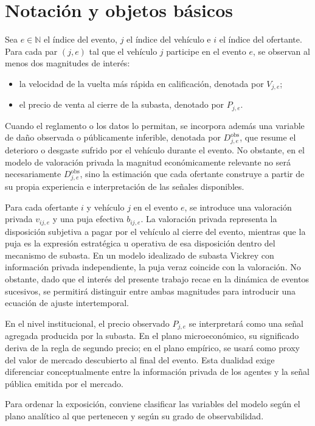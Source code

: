 \documentclass[11pt,a4paper]{article}
\theoremstyle{definition}
\begin{document}
\section{Notación y objetos básicos}

Sea $e\in\mathbb{N}$ el índice del evento, $j$ el índice del vehículo e $i$ el índice del ofertante. Para cada par $(j,e)$ tal que el vehículo $j$ participe en el evento $e$, se observan al menos dos magnitudes de interés:
\begin{itemize}[leftmargin=1.5cm]
    \item la velocidad de la vuelta más rápida en calificación, denotada por $V_{j,e}$;
    \item el precio de venta al cierre de la subasta, denotado por $P_{j,e}$.
\end{itemize}
Cuando el reglamento o los datos lo permitan, se incorpora además una variable de daño observada o públicamente inferible, denotada por $D_{j,e}^{\mathrm{obs}}$, que resume el deterioro o desgaste sufrido por el vehículo durante el evento. No obstante, en el modelo de valoración privada la magnitud económicamente relevante no será necesariamente $D_{j,e}^{\mathrm{obs}}$, sino la estimación que cada ofertante construye a partir de su propia experiencia e interpretación de las señales disponibles.

Para cada ofertante $i$ y vehículo $j$ en el evento $e$, se introduce una valoración privada $v_{ij,e}$ y una puja efectiva $b_{ij,e}$. La valoración privada representa la disposición subjetiva a pagar por el vehículo al cierre del evento, mientras que la puja es la expresión estratégica u operativa de esa disposición dentro del mecanismo de subasta. En un modelo idealizado de subasta Vickrey con información privada independiente, la puja veraz coincide con la valoración. No obstante, dado que el interés del presente trabajo recae en la dinámica de eventos sucesivos, se permitirá distinguir entre ambas magnitudes para introducir una ecuación de ajuste intertemporal.

En el nivel institucional, el precio observado $P_{j,e}$ se interpretará como una señal agregada producida por la subasta. En el plano microeconómico, su significado deriva de la regla de segundo precio; en el plano empírico, se usará como proxy del valor de mercado descubierto al final del evento. Esta dualidad exige diferenciar conceptualmente entre la información privada de los agentes y la señal pública emitida por el mercado.

Para ordenar la exposición, conviene clasificar las variables del modelo según el plano analítico al que pertenecen y según su grado de observabilidad.
\end{document}
